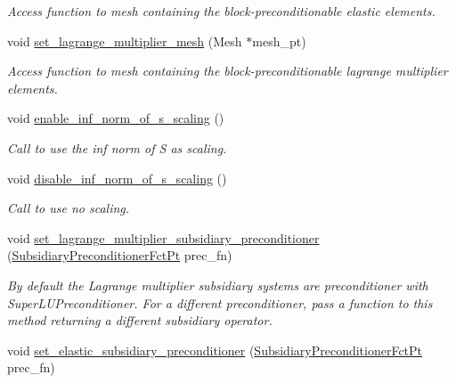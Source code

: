 \begin{DoxyCompactItemize}
\begin{DoxyCompactList}\small\item\em Access function to mesh containing the block-\/preconditionable elastic elements. \end{DoxyCompactList}\item 
void \hyperlink{classoomph_1_1PseudoElasticPreconditioner_a6030c2461383ee1a0b8ac6ed56b0daf6}{set\+\_\+lagrange\+\_\+multiplier\+\_\+mesh} (Mesh $\ast$mesh\+\_\+pt)
\begin{DoxyCompactList}\small\item\em Access function to mesh containing the block-\/preconditionable lagrange multiplier elements. \end{DoxyCompactList}\item 
void \hyperlink{classoomph_1_1PseudoElasticPreconditioner_a917caf20e03fc8bdb45336206ce5365e}{enable\+\_\+inf\+\_\+norm\+\_\+of\+\_\+s\+\_\+scaling} ()
\begin{DoxyCompactList}\small\item\em Call to use the inf norm of S as scaling. \end{DoxyCompactList}\item 
void \hyperlink{classoomph_1_1PseudoElasticPreconditioner_a038e7d2eaea4346c3ea6ba2b34ae824c}{disable\+\_\+inf\+\_\+norm\+\_\+of\+\_\+s\+\_\+scaling} ()
\begin{DoxyCompactList}\small\item\em Call to use no scaling. \end{DoxyCompactList}\item 
void \hyperlink{classoomph_1_1PseudoElasticPreconditioner_a64865a85f35ae9385f9f8d68e75595e0}{set\+\_\+lagrange\+\_\+multiplier\+\_\+subsidiary\+\_\+preconditioner} (\hyperlink{classoomph_1_1PseudoElasticPreconditioner_a1462e1ef48ed2668c06dfd36c783d1a5}{Subsidiary\+Preconditioner\+Fct\+Pt} prec\+\_\+fn)
\begin{DoxyCompactList}\small\item\em By default the Lagrange multiplier subsidiary systems are preconditioner with Super\+L\+U\+Preconditioner. For a different preconditioner, pass a function to this method returning a different subsidiary operator. \end{DoxyCompactList}\item 
void \hyperlink{classoomph_1_1PseudoElasticPreconditioner_a8c75fe5786d64a042056df16a062c055}{set\+\_\+elastic\+\_\+subsidiary\+\_\+preconditioner} (\hyperlink{classoomph_1_1PseudoElasticPreconditioner_a1462e1ef48ed2668c06dfd36c783d1a5}{Subsidiary\+Preconditioner\+Fct\+Pt} prec\+\_\+fn)

\end{DoxyCompactItemize}

